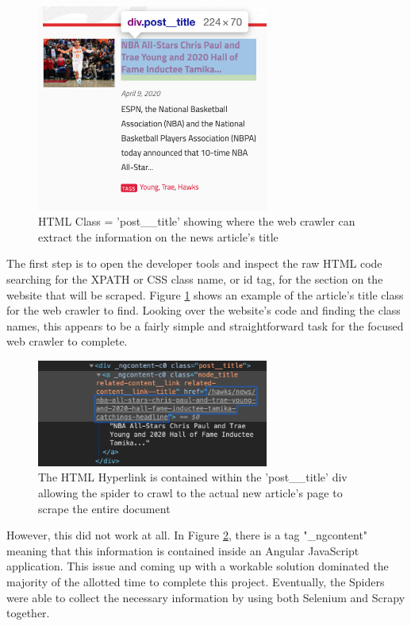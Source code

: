 \documentclass[5p,authoryear]{elsarticle}
\begin{document}
\begin{figure}[!htb] \centering
	\includegraphics[width=3.0in]{figures/post_title.png}
	\caption[]{HTML Class = 'post\_\_title' showing where the web crawler can extract the information on the news article's title} 
	\label{Post Title} 
\end{figure}

The first step is to open the developer tools and inspect the raw HTML code searching for the XPATH or CSS class name, or id tag, for the section on the website that will be scraped. Figure \ref{Post Title} shows an example of the article's title class for the web crawler to find. Looking over the website's code and finding the class names, this appears to be a fairly simple and straightforward task for the focused web crawler to complete. 


\begin{figure}[!htb] \centering
	\includegraphics[width=3.0in]{figures/post_link.png}
	\caption[]{The HTML Hyperlink is contained within the 'post\_\_title' div allowing the spider to crawl to the actual new article's page to scrape the entire document} 
	\label{Post Link} 
\end{figure}



However, this did not work at all. In Figure \ref{Post Link}, there is a tag "\_ngcontent" meaning that this information is contained inside an Angular JavaScript application. This issue and coming up with a workable solution dominated the majority of the allotted time to complete this project. Eventually, the Spiders were able to collect the necessary information by using both Selenium and Scrapy together.
\end{document}
